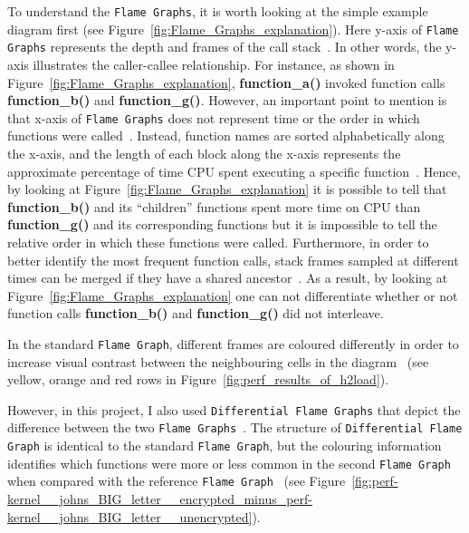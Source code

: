 \documentclass[12pt,a4paper]{report}
\begin{document}
To understand the \texttt{Flame Graphs}, it is worth looking at the simple example diagram first (see Figure~\ref{fig:Flame_Graphs_explanation}).
Here y-axis of \texttt{Flame Graphs} represents the depth and frames of the call stack~\cite{CPU_Flame_graphs}.
In other words, the y-axis illustrates the caller-callee relationship.
For instance, as shown in Figure~\ref{fig:Flame_Graphs_explanation}, \textbf{function\_a()} invoked function calls \textbf{function\_b()} and \textbf{function\_g()}. 
However, an important point to mention is that x-axis of \texttt{Flame Graphs} does not represent time or the order in which functions were called~\cite{CPU_Flame_graphs}.
Instead, function names are sorted alphabetically along the x-axis, and the length of each block along the x-axis represents the approximate percentage of time CPU spent executing a specific function~\cite{CPU_Flame_graphs}.
Hence, by looking at Figure~\ref{fig:Flame_Graphs_explanation} it is possible to tell that \textbf{function\_b()} and its \enquote{children} functions spent more time on CPU than \textbf{function\_g()} and its corresponding functions but it is impossible to tell the relative order in which these functions were called.
Furthermore, in order to better identify the most frequent function calls, stack frames sampled at different times can be merged if they have a shared ancestor~\cite{CPU_Flame_graphs}.
As a result, by looking at Figure~\ref{fig:Flame_Graphs_explanation} one can not differentiate whether or not function calls \textbf{function\_b()} and \textbf{function\_g()} did not interleave.

In the standard \texttt{Flame Graph}, different frames are coloured differently in order to increase visual contrast between the neighbouring cells in the diagram~\cite{CPU_Flame_graphs} (see yellow, orange and red rows in Figure~\ref{fig:perf_results_of_h2load}).


However, in this project, I also used \texttt{Differential Flame Graphs} that depict the difference between the two \texttt{Flame Graphs}~\cite{Differential_Flame_Graphs}.
The structure of \texttt{Differential Flame Graph} is identical to the standard \texttt{Flame Graph}, but the colouring information identifies which functions were more or less common in the second \texttt{Flame Graph} when compared with the reference \texttt{Flame Graph}~\cite{Differential_Flame_Graphs} (see Figure~\ref{fig:perf-kernel__johns_BIG_letter__encrypted_minus_perf-kernel__johns_BIG_letter__unencrypted}).
\end{document}
